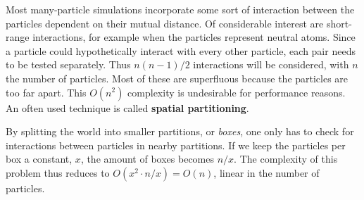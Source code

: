 Most many-particle simulations incorporate some sort of interaction between the 
particles dependent on their mutual distance. Of considerable interest are 
short-range interactions, for example when the particles represent neutral 
atoms.  Since a particle could hypothetically interact with every other 
particle, each pair needs to be tested separately. Thus $n(n-1)/2$ interactions 
will be considered, with $n$ the number of particles. Most of these are 
superfluous because the particles are too far apart. This $O(n^2)$ complexity 
is undesirable for performance reasons.  An often used technique is called 
\textbf{spatial partitioning}.

By splitting the world into smaller partitions, or \emph{boxes}, one only 
has to check for interactions between particles in nearby partitions. If we 
keep the particles per box a constant, $x$, the amount of boxes becomes $n/x$.  
The complexity of this problem thus reduces to $O(x^2 \cdot n/x) = O(n)$, 
linear in the number of particles.
